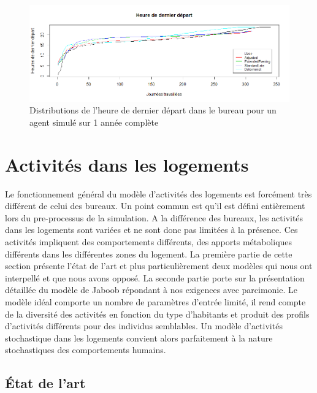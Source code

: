 \begin{figure}
\centering
\includegraphics[scale=0.45]{Images/PageActivities/DernierDepart}
\caption{Distributions de l'heure de dernier départ dans le bureau pour un agent simulé sur 1 année complète}
\label{fig:DernierDepart}
\end{figure}

\newpage
\section{Activités dans les logements}
\label{ActivitésLogements}

Le fonctionnement général du modèle d'activités des logements est forcément très différent de celui des bureaux. Un point commun est qu'il est défini entièrement lors du pre-processus de la simulation. A la différence des bureaux, les activités dans les logements sont variées et ne sont donc pas limitées à la présence. Ces activités impliquent des comportements différents, des apports métaboliques différents dans les différentes zones du logement. La première partie de cette section présente l'état de l'art et plus particulièrement deux modèles qui nous ont interpellé et que nous avons opposé. La seconde partie porte sur la présentation détaillée du modèle de Jaboob \cite{Jaboob-16} répondant à nos exigences avec parcimonie. Le modèle idéal comporte un nombre de paramètres d'entrée limité, il rend compte de la diversité des activités en fonction du type d'habitants et produit des profils d'activités différents pour des individus semblables. Un modèle d'activités stochastique dans les logements convient alors parfaitement à la nature stochastiques des comportements humains.

\subsection{État de l'art}


